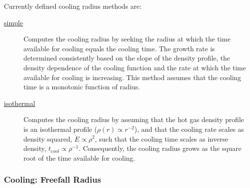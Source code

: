 Currently defined cooling radius methods are:
\begin{description}
 \item [\hyperlink{cooling.cooling_radius.simple.F90:cooling_radii_simple:cooling_radius_simple}{{\normalfont \ttfamily simple}}] Computes the cooling radius by seeking the radius at which the time available for cooling equals the cooling time. The growth rate is determined consistently based on the slope of the density profile, the density dependence of the cooling function and the rate at which the time available for cooling is increasing. This method assumes that the cooling time is a monotonic function of radius.
 \item [\hyperlink{cooling.cooling_radius.isothermal_profile.F90:cooling_radii_isothermal:cooling_radius_isothermal}{{\normalfont \ttfamily isothermal}}] Computes the cooling radius by assuming that the hot gas density profile is an isothermal profile ($\rho(r) \propto r^{-2}$), and that the cooling rate scales as density squared, $\dot{E}\propto \rho^2$, such that the cooling time scales as inverse density, $t_{\mathrm cool} \propto \rho^{-1}$. Consequently, the cooling radius grows as the square root of the time available for cooling.
\end{description}

\subsubsection{Cooling: Freefall Radius}

